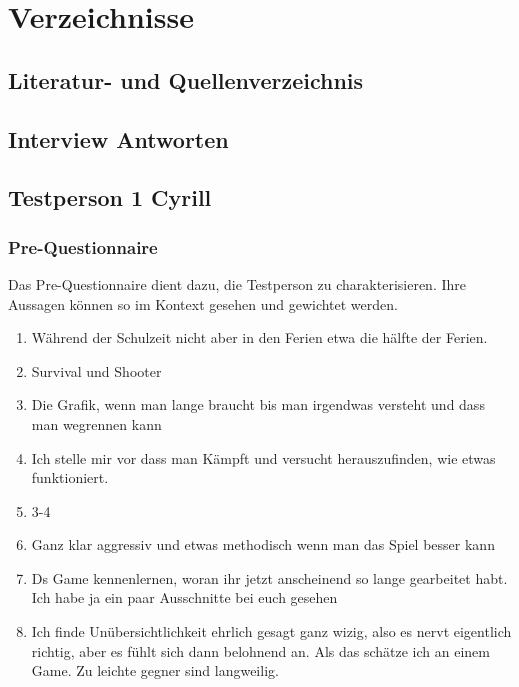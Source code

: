 \documentclass[../Main.tex]{subfiles}
\begin{document}
\section{Verzeichnisse}

\subsection{Literatur- und Quellenverzeichnis}

\printbibliography[heading=none]

\subsection{Interview Antworten}

\subsection{Testperson 1 Cyrill}
\subsubsection{Pre-Questionnaire}

Das Pre-Questionnaire dient dazu, die Testperson zu charakterisieren. Ihre Aussagen können so im Kontext gesehen und gewichtet werden.

\begin{enumerate}[label=\textbf{P\arabic*}, leftmargin=1.5cm, itemsep=0.5em]
    \item Während der Schulzeit nicht aber in den Ferien etwa die hälfte der Ferien.
    \item Survival und Shooter
    \item Die Grafik, wenn man lange braucht bis man irgendwas versteht und dass man wegrennen kann
    \item Ich stelle mir vor dass man Kämpft und versucht herauszufinden, wie etwas funktioniert.
    \item 3-4
    \item Ganz klar aggressiv und etwas methodisch wenn man das Spiel besser kann
    \item Ds Game kennenlernen, woran ihr jetzt anscheinend so lange gearbeitet habt. Ich habe ja ein paar Ausschnitte bei euch gesehen
    \item Ich finde Unübersichtlichkeit ehrlich gesagt ganz wizig, also es nervt eigentlich richtig, aber es fühlt sich dann belohnend an. Als das schätze ich an einem Game. Zu leichte gegner sind langweilig.
\end{enumerate}
\end{document}
